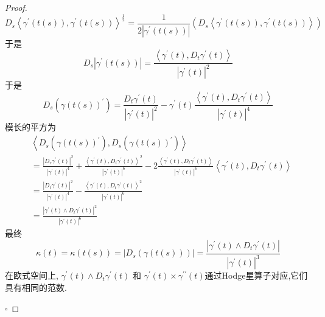 \documentclass[../../几何与拓扑.tex]{subfiles}
\begin{document}
\begin{proof}
\[    \]\[
    D_{s}\left< \gamma ^{\prime} \left( t\left( s \right)  \right), \gamma ^{\prime} \left( t\left( s \right)  \right)   \right>^{\frac{1}{2}}= \frac{1 }{2\left|  \gamma ^{\prime} \left( t\left( s \right)  \right)  \right|  } \left( D_{s}\left< \gamma ^{\prime} \left( t\left( s \right)  \right), \gamma ^{\prime} \left( t\left( s \right)  \right)   \right> \right)  
    \]于是 \[
    D_{s}\left|  \gamma ^{\prime} \left( t\left( s \right)  \right)  \right|=  \frac{\left< \gamma ^{\prime} \left( t \right),D_{t} \gamma ^{\prime} \left( t \right)   \right> }{\left|  \gamma ^{\prime} \left( t \right)  \right|^{2}  }  
    \]于是 \[
    D_{s}\left(  \gamma \left( t\left( s \right)  \right)^{\prime}   \right)= \frac{D_{t} \gamma ^{\prime} \left( t \right)  }{\left|  \gamma ^{\prime} \left( t \right)  \right| ^{2} }- \gamma ^{\prime} \left( t \right)   \frac{\left< \gamma ^{\prime} \left( t \right)  ,D_{t} \gamma ^{\prime} \left( t \right) \right> }{ \left|  \gamma ^{\prime} \left( t \right)  \right|^{4} } 
    \] 模长的平方为 \[
    \begin{aligned}
    &\left<D_{s}\left(  \gamma \left( t\left( s \right)  \right)^{\prime}   \right),D_{s}\left(  \gamma \left( t\left( s \right)  \right)^{\prime}   \right)   \right>\\ 
     &=  \frac{\left| D_{r} \gamma ^{\prime} \left( t \right)  \right|^{2}  }{ \left|  \gamma ^{\prime} \left( t \right)  \right|^{4} }+ \frac{\left< \gamma ^{\prime} \left( t \right),D_{t} \gamma ^{\prime} \left( t \right)   \right>^{2} }{\left|  \gamma ^{\prime} \left( t \right)  \right|^{6}  }- 2 \frac{\left< \gamma ^{\prime} \left( t \right),D_{t} \gamma ^{\prime} \left( t \right)   \right> }{\left|  \gamma ^{\prime} \left( t \right)  \right|^{6}  }\left< \gamma ^{\prime} \left( t \right),D_{t} \gamma ^{\prime} \left( t \right)   \right>   \\ 
      &=  \frac{\left| D_{t} \gamma ^{\prime} \left( t \right)  \right|^{2}  }{\left|  \gamma ^{\prime} \left( t \right)  \right|^{4}  }- \frac{\left< \gamma ^{\prime} \left( t \right),D_{t} \gamma ^{\prime} \left( t \right)   \right>^{2} }{\left|  \gamma ^{\prime} \left( t \right)  \right|^{6}  }\\ 
       &=  \frac{\left|  \gamma ^{\prime} \left( t \right)\wedge D_{t} \gamma ^{\prime} \left( t \right)   \right|^{2}  }{\left|  \gamma ^{\prime} \left( t \right)  \right|^{6}  }   
    \end{aligned}
    \]最终 \[
     \kappa \left( t \right)=  \kappa \left( t\left( s \right)  \right)= \left| D_{s}\left(  \gamma \left( t\left( s \right)  \right)  \right)  \right|=  \frac{\left|  \gamma ^{\prime} \left( t \right)\wedge D_{t} \gamma ^{\prime} \left( t \right)   \right|  }{\left|  \gamma ^{\prime} \left( t \right)  \right|^{3}  }    
    \]在欧式空间上, \(   \gamma ^{\prime} \left( t \right)\wedge D_{t} \gamma ^{\prime} \left( t \right)    \) 和 \(   \gamma ^{\prime} \left( t \right)\times  \gamma ^{\prime \prime} \left( t \right)    \)通过Hodge星算子对应,它们具有相同的范数. 
    
    \hfill $\square$
\end{proof}
\hspace*{\fill} 
\end{document}
